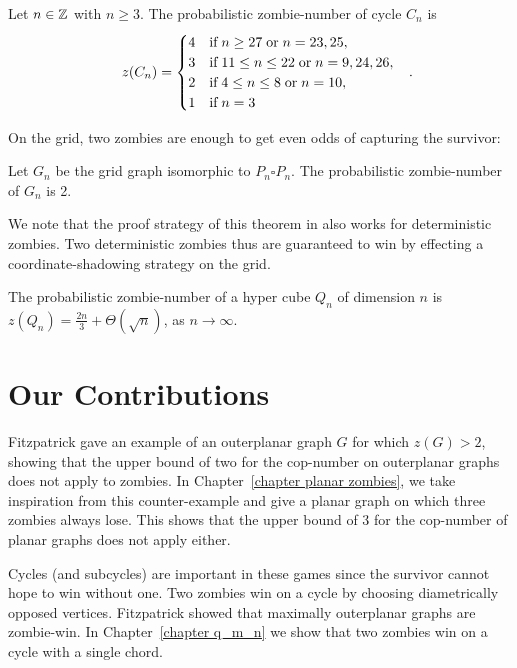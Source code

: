 \begin{theorem}
  Let $n\in \mathbb{Z}$ with $n\geq 3$. The probabilistic zombie-number of cycle $C_n$ is
  \[z(C_n) =
  \begin{cases}
    4 & \text{if} \; n \geq 27 \; \text{or} \; n=23,25, \\
    3 & \text{if} \; 11 \leq n \leq 22 \; \text{or} \; n=9,24,26, \\
    2 & \text{if} \; 4 \leq n \leq 8 \; \text{or} \; n=10, \\
    1 & \text{if} \; n =3
\end{cases} \mperiod \]
\end{theorem}

On the grid, two zombies are enough to get even odds \cite{bonato2016probabilistic} of capturing the survivor:
\begin{theorem}
  Let $G_n$ be the grid graph isomorphic to $P_n \square P_n$. The probabilistic zombie-number of $G_n$ is 2.
\end{theorem}
We note that the proof strategy of this theorem in \cite{bonato2016probabilistic} also works for deterministic zombies. Two deterministic zombies thus are guaranteed to win by effecting a coordinate-shadowing strategy on the grid.

\begin{theorem}
  The probabilistic zombie-number of a hyper cube $Q_n$ of dimension $n$ is $z(Q_n) = \frac{2n}{3} + \Theta(\sqrt{n})$, as $n \rightarrow \infty$.
\end{theorem}

\section{Our Contributions}
Fitzpatrick \cite{fitzpatrick2016deterministic} gave an example of an outerplanar graph $G$ for which $z(G) >2$, showing that the upper bound of two for the cop-number on outerplanar graphs does not apply to zombies. In Chapter~\ref{chapter planar zombies}, we take inspiration from this counter-example and give a planar graph on which three zombies always lose. This shows that the upper bound of 3 for the cop-number of planar graphs does not apply either.

Cycles (and subcycles) are important in these games since the survivor cannot hope to win without one. Two zombies win on a cycle by choosing diametrically opposed vertices. Fitzpatrick showed that maximally outerplanar graphs are zombie-win. In Chapter~\ref{chapter q_m_n} we show that two zombies win on a cycle with a single chord.
